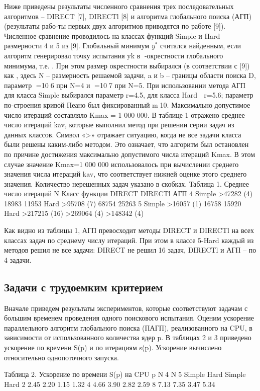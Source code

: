 Ниже приведены результаты численного сравнения трех последовательных алгоритмов – DIRECT [7], DIRECTl [8] и алгоритма глобального поиска (АГП) (результаты рабо-ты первых двух алгоритмов приводятся по работе [9]). Численное сравнение проводилось на классах функций Simple и Hard размерности 4 и 5 из [9]. Глобальный минимум \(y^*\) считался найденным, если алгоритм генерировал точку испытания yk в -окрестности глобального минимума, т.е.  . При этом размер окрестности выбирался (в соответствии с [9]) как  , здесь N – размерность решаемой задачи, a и b – границы области поиска D, параметр =106 при N=4 и =107 при N=5. При использовании метода АГП для класса Simple выбирался параметр r=4.5, для класса Hard  r=5.6; параметр по-строения кривой Пеано был фиксированный m10. Максимально допустимое число итераций составляло Kmax = 1 000 000. 
В таблице 1 отражено среднее число итераций kav, которые выполнил метод при решении серии задач из данных классов. Символ «>» отражает ситуацию, когда не все задачи класса были решены каким-либо методом. Это означает, что алгоритм был остановлен по причине достижения максимально допустимого числа итераций Kmax. В этом случае значение Kmax=1 000 000 использовалось при вычислении среднего значения числа итераций kav, что соответствует нижней оценке этого среднего значения. Количество нерешенных задач указано в скобках.
Таблица 1. Среднее число итераций
N	Класс функции	DIRECT	DIRECTl	АГП
4	Simple	>47282 (4)	18983	11953
	Hard	>95708 (7)	68754	25263
5	Simple	>16057 (1)	16758	15920
	Hard	>217215 (16)	>269064 (4)	>148342 (4)

Как видно из таблицы 1, АГП превосходит методы DIRECT и DIRECTl на всех классах задач по среднему числу итераций. При этом в классе 5-Hard каждый из методов решил не все задачи: DIRECT не решил 16 задач, DIRECTl и АГП – по 4 задачи.
\subsection{Задачи с трудоемким критерием}
Вначале приведем результаты экспериментов, которые соответствуют задачам с большим временем проведения одного поискового испытания. Оценим ускорение параллельного алгоритм глобального поиска (ПАГП), реализованного на CPU, в зависимости от использованного количества ядер p. В таблицах 2 и 3 приведено ускорение по времени S(p) и по итерациям s(p). Ускорение вычислено относительно однопоточного запуска.

Таблица 2. Ускорение по времени S(p) на CPU
p	N4	N5
	Simple	Hard	Simple	Hard
2	2.45	2.20	1.15	1.32
4	4.66	3.90	2.82	2.59
8	7.13	7.35	3.47	5.34


